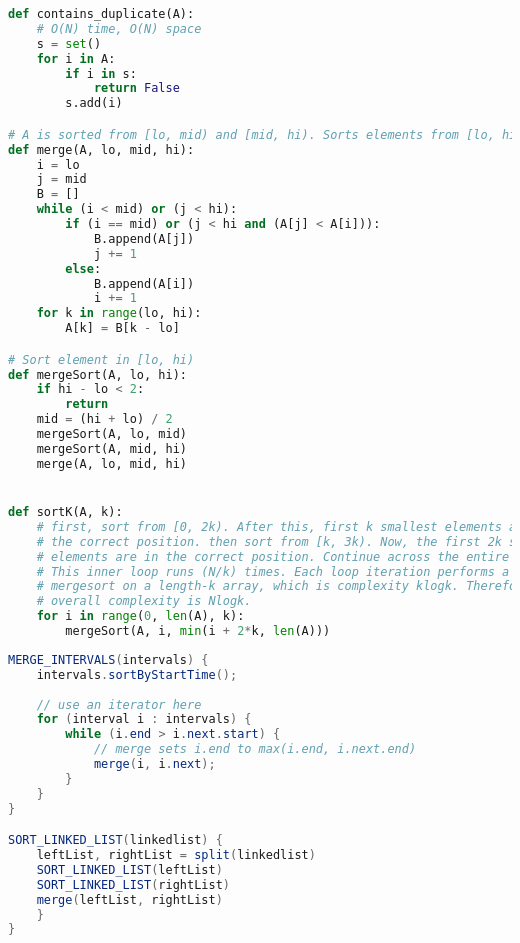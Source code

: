 \documentclass{article}
\begin{document}
\begin{lstlisting}[language=Python]
def contains_duplicate(A):
    # O(N) time, O(N) space
    s = set()
    for i in A:
        if i in s:
            return False
        s.add(i)

# A is sorted from [lo, mid) and [mid, hi). Sorts elements from [lo, hi)
def merge(A, lo, mid, hi):
    i = lo
    j = mid
    B = []
    while (i < mid) or (j < hi):
        if (i == mid) or (j < hi and (A[j] < A[i])):
            B.append(A[j])
            j += 1
        else:
            B.append(A[i])
            i += 1
    for k in range(lo, hi):
        A[k] = B[k - lo]

# Sort element in [lo, hi)
def mergeSort(A, lo, hi):
    if hi - lo < 2:
        return
    mid = (hi + lo) / 2
    mergeSort(A, lo, mid)
    mergeSort(A, mid, hi)
    merge(A, lo, mid, hi)


def sortK(A, k):
    # first, sort from [0, 2k). After this, first k smallest elements are in
    # the correct position. then sort from [k, 3k). Now, the first 2k smallest
    # elements are in the correct position. Continue across the entire array.
    # This inner loop runs (N/k) times. Each loop iteration performs a
    # mergesort on a length-k array, which is complexity klogk. Therefore,
    # overall complexity is Nlogk.
    for i in range(0, len(A), k):
        mergeSort(A, i, min(i + 2*k, len(A)))
\end{lstlisting}

\begin{lstlisting}[language=Java]
MERGE_INTERVALS(intervals) {
    intervals.sortByStartTime();
    
    // use an iterator here
    for (interval i : intervals) {
        while (i.end > i.next.start) {
            // merge sets i.end to max(i.end, i.next.end)
            merge(i, i.next);
        }
    }
}

SORT_LINKED_LIST(linkedlist) {
    leftList, rightList = split(linkedlist)
    SORT_LINKED_LIST(leftList)
    SORT_LINKED_LIST(rightList)
    merge(leftList, rightList)
    }
}

\end{lstlisting}
\end{document}
